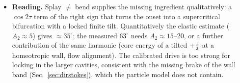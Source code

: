 \begin{itemize}
        $67^\circ$ at $R/\ell_a=0.6$ with the full drive. $A_2=10$: $\approx49^\circ$; $A_2=5$ (the computed value): $\approx35^\circ$. With the full calibrated drive
        at $R/\ell_a\ge0.8$ the layer slides for every $A_2$.
  \item \textbf{Reading.} Splay $\neq$ bend supplies the missing ingredient qualitatively: a $\cos2\tau$ term of the right sign that turns the onset into a
        supercritical bifurcation with a locked finite tilt. Quantitatively the elastic estimate ($A_2\approx5$) gives $\approx35^\circ$; the measured $63^\circ$
        needs $A_2\approx15$--20, or a further contribution of the same harmonic (core energy of a tilted $+\tfrac12$ at a homeotropic wall, flow alignment). The
        calibrated drive is too strong for locking in the larger cavities, consistent with the missing brake of the wall band (Sec.~\ref{sec:dirstokes}),
        which the particle model does not contain.
\end{itemize}

